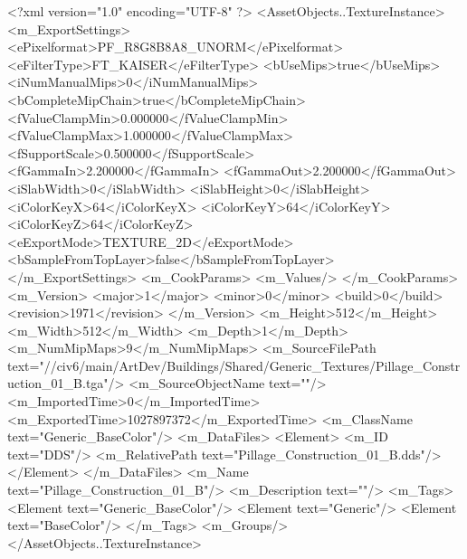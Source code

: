 <?xml version="1.0" encoding="UTF-8" ?>
<AssetObjects..TextureInstance>
	<m_ExportSettings>
		<ePixelformat>PF_R8G8B8A8_UNORM</ePixelformat>
		<eFilterType>FT_KAISER</eFilterType>
		<bUseMips>true</bUseMips>
		<iNumManualMips>0</iNumManualMips>
		<bCompleteMipChain>true</bCompleteMipChain>
		<fValueClampMin>0.000000</fValueClampMin>
		<fValueClampMax>1.000000</fValueClampMax>
		<fSupportScale>0.500000</fSupportScale>
		<fGammaIn>2.200000</fGammaIn>
		<fGammaOut>2.200000</fGammaOut>
		<iSlabWidth>0</iSlabWidth>
		<iSlabHeight>0</iSlabHeight>
		<iColorKeyX>64</iColorKeyX>
		<iColorKeyY>64</iColorKeyY>
		<iColorKeyZ>64</iColorKeyZ>
		<eExportMode>TEXTURE_2D</eExportMode>
		<bSampleFromTopLayer>false</bSampleFromTopLayer>
	</m_ExportSettings>
	<m_CookParams>
		<m_Values/>
	</m_CookParams>
	<m_Version>
		<major>1</major>
		<minor>0</minor>
		<build>0</build>
		<revision>1971</revision>
	</m_Version>
	<m_Height>512</m_Height>
	<m_Width>512</m_Width>
	<m_Depth>1</m_Depth>
	<m_NumMipMaps>9</m_NumMipMaps>
	<m_SourceFilePath text="//civ6/main/ArtDev/Buildings/Shared/Generic_Textures/Pillage_Construction_01_B.tga"/>
	<m_SourceObjectName text=""/>
	<m_ImportedTime>0</m_ImportedTime>
	<m_ExportedTime>1027897372</m_ExportedTime>
	<m_ClassName text="Generic_BaseColor"/>
	<m_DataFiles>
		<Element>
			<m_ID text="DDS"/>
			<m_RelativePath text="Pillage_Construction_01_B.dds"/>
		</Element>
	</m_DataFiles>
	<m_Name text="Pillage_Construction_01_B"/>
	<m_Description text=""/>
	<m_Tags>
		<Element text="Generic_BaseColor"/>
		<Element text="Generic"/>
		<Element text="BaseColor"/>
	</m_Tags>
	<m_Groups/>
</AssetObjects..TextureInstance>

